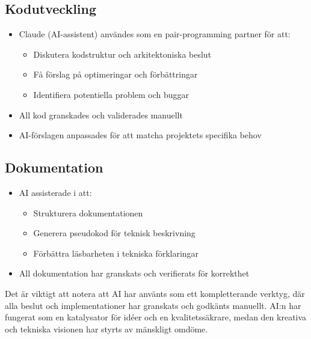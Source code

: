 \documentclass[a4paper,12pt]{article}
\begin{document}
\subsection*{Kodutveckling}
\begin{itemize}
    \item Claude (AI-assistent) användes som en pair-programming partner för att:
    \begin{itemize}
        \item Diskutera kodstruktur och arkitektoniska beslut
        \item Få förslag på optimeringar och förbättringar
        \item Identifiera potentiella problem och buggar
    \end{itemize}
    \item All kod granskades och validerades manuellt
    \item AI-förslagen anpassades för att matcha projektets specifika behov
\end{itemize}

\subsection*{Dokumentation}
\begin{itemize}
    \item AI assisterade i att:
    \begin{itemize}
        \item Strukturera dokumentationen
        \item Generera pseudokod för teknisk beskrivning
        \item Förbättra läsbarheten i tekniska förklaringar
    \end{itemize}
    \item All dokumentation har granskats och verifierats för korrekthet
\end{itemize}

Det är viktigt att notera att AI har använts som ett kompletterande verktyg, där alla beslut och implementationer har granskats och godkänts manuellt. AI:n har fungerat som en katalysator för idéer och en kvalitetssäkrare, medan den kreativa och tekniska visionen har styrts av mänskligt omdöme.
\end{document}
